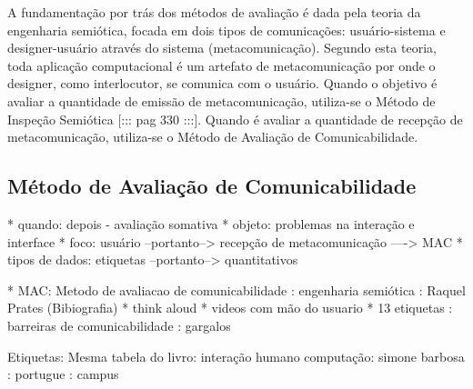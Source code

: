 \indent A fundamentação por trás dos métodos de avaliação é dada pela teoria da engenharia semiótica, focada em dois tipos de comunicações: usuário-sistema e designer-usuário através do sistema (metacomunicação). Segundo esta teoria, toda aplicação computacional é um artefato de metacomunicação por onde o designer, como interlocutor, se comunica com o usuário. Quando o objetivo é avaliar a quantidade de emissão de metacomunicação, utiliza-se o Método de Inspeção Semiótica [::: pag 330 :::]. Quando é avaliar a quantidade de recepção de metacomunicação, utiliza-se o Método de Avaliação de Comunicabilidade. 

\subsection{Método de Avaliação de Comunicabilidade}


* quando: depois - avaliação somativa
* objeto: problemas na interação e interface
* foco: usuário --portanto--> recepção de metacomunicação ----> MAC
* tipos de dados: etiquetas --portanto--> quantitativos

* MAC: Metodo de avaliacao de comunicabilidade : engenharia semiótica : Raquel Prates (Bibiografia)
* think aloud
* videos com mão do usuario
* 13 etiquetas : barreiras de comunicabilidade : gargalos

Etiquetas: Mesma tabela do livro: interação humano computação: simone barbosa : portugue : campus

